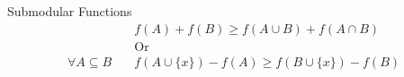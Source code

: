 \begin{frame}{Submodular Functions}
\begin{align*}
    & f(A) + f(B) \geq f(A \cup B) + f(A \cap B) 
    \\
    & \text{Or}
    \\
    \forall A \subseteq B \quad & f(A \cup \{x\}) - f(A) \geq f(B \cup \{x\}) - f(B)
    \\
\end{align*}
\end{frame}